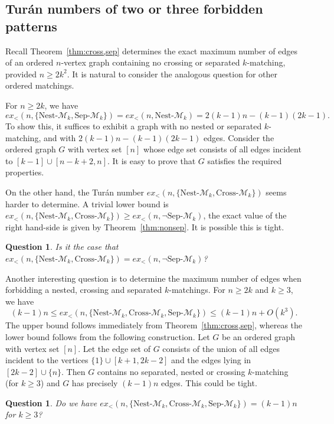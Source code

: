 \documentclass[11pt]{article}
\newtheorem{question}[theorem]{Question}
\theoremstyle{definition}
\begin{document}
\subsection{Tur\'an numbers of two or three forbidden patterns}

Recall Theorem~\ref{thm:cross,sep} determines the exact maximum number of edges of an ordered $n$-vertex graph containing no crossing or separated $k$-matching, provided $n\ge 2k^2$.
It is natural to consider the analogous question for other ordered matchings.

For $n\ge2k$, we have
$$ex_<(n,\{\text{Nest-}\mathcal M_k,\text{Sep-}\mathcal M_k\})=ex_<(n,\text{Nest-}\mathcal M_k)=2(k-1)n-(k-1)(2k-1).$$
To show this, it suffices to exhibit a graph with no nested or separated $k$-matching, and with $2(k-1)n-(k-1)(2k-1)$ edges. 
Consider the ordered graph $G$ with vertex set $[n]$ whose edge set consists of all edges incident to $[k-1]\cup[n-k+2,n]$.
It is easy to prove that $G$ satisfies the required properties.

On the other hand, the Tur\'an number $ex_<(n,\{\text{Nest-}\mathcal M_k,\text{Cross-}\mathcal M_k\})$ seems harder to determine.
A trivial lower bound is $ex_<(n,\{\text{Nest-}\mathcal M_k,\text{Cross-}\mathcal M_k\})\ge ex_<(n,\neg\text{Sep-}\mathcal M_k)$, the exact value of the right hand-side is given by Theorem~\ref{thm:nonsep}.
It is possible this is tight.

\begin{question}
Is it the case that $ex_<(n,\{\text{Nest-}\mathcal M_k,\text{Cross-}\mathcal M_k\})=ex_<(n,\neg\text{Sep-}\mathcal M_k)$? 
\end{question}

Another interesting question is to determine the maximum number of edges when forbidding a nested, crossing and separated $k$-matchings.
For $n\ge2k$ and $k\ge3$, we have 
$$(k-1)n\le ex_<(n,\{\text{Nest-}\mathcal M_k,\text{Cross-}\mathcal M_k,\text{Sep-}\mathcal M_k\})\le(k-1)n+O(k^3).$$
The upper bound follows immediately from Theorem~\ref{thm:cross,sep}, whereas the lower bound follows from the following construction.
Let $G$ be an ordered graph with vertex set $[n]$.
Let the edge set of $G$ consists of the union of all edges incident to the vertices $\{1\}\cup[k+1,2k-2]$ and the edges lying in $[2k-2]\cup\{n\}$.
Then $G$ contains no separated, nested or crossing $k$-matching (for $k\ge3$) and $G$ has precisely $(k-1)n$ edges.
This could be tight.

\begin{question}
Do we have $ex_<(n,\{\text{Nest-}\mathcal M_k,\text{Cross-}\mathcal M_k,\text{Sep-}\mathcal M_k\})=(k-1)n$ for $k\ge3$? 
\end{question}
\end{document}
